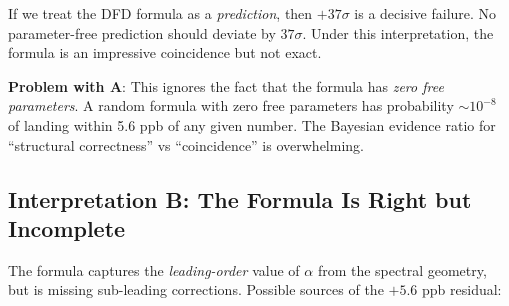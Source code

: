 \documentclass[11pt,a4paper]{article}
\begin{document}
If we treat the DFD formula as a \emph{prediction}, then $+37\sigma$ is a decisive failure. No parameter-free prediction should deviate by $37\sigma$. Under this interpretation, the formula is an impressive coincidence but not exact.

\textbf{Problem with A}: This ignores the fact that the formula has \emph{zero free parameters}. A random formula with zero free parameters has probability $\sim 10^{-8}$ of landing within 5.6 ppb of any given number. The Bayesian evidence ratio for ``structural correctness'' vs ``coincidence'' is overwhelming.

\subsection{Interpretation B: The Formula Is Right but Incomplete}

The formula captures the \emph{leading-order} value of $\alpha$ from the spectral geometry, but is missing sub-leading corrections. Possible sources of the $+5.6$ ppb residual:
\end{document}
